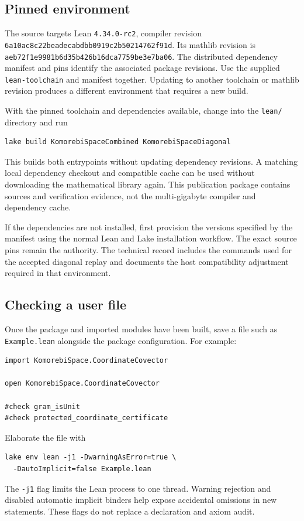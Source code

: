 \documentclass[11pt]{article}
\newcommand{\leanname}[1]{{\small\ttfamily\nolinkurl{#1}}}
\begin{document}
\subsection{Pinned environment}
The source targets Lean \leanname{4.34.0-rc2}, compiler revision
\leanname{6a10ac8c22beadecabdbb0919c2b50214762f91d}. Its mathlib revision is
\leanname{aeb72f1e9981b6d35b426b16dca7759be3e7ba06}.
The distributed dependency manifest and pins identify the associated package revisions. Use the supplied \leanname{lean-toolchain} and manifest together. Updating to another toolchain or mathlib revision produces a different environment that requires a new build.

With the pinned toolchain and dependencies available, change into the \leanname{lean/} directory and run
\begin{verbatim}
lake build KomorebiSpaceCombined KomorebiSpaceDiagonal
\end{verbatim}
This builds both entrypoints without updating dependency revisions. A matching local dependency checkout and compatible cache can be used without downloading the mathematical library again. This publication package contains sources and verification evidence, not the multi-gigabyte compiler and dependency cache.

If the dependencies are not installed, first provision the versions specified by the manifest using the normal Lean and Lake installation workflow. The exact source pins remain the authority. The technical record includes the commands used for the accepted diagonal replay and documents the host compatibility adjustment required in that environment.

\subsection{Checking a user file}
Once the package and imported modules have been built, save a file such as \leanname{Example.lean} alongside the package configuration. For example:
\begin{verbatim}
import KomorebiSpace.CoordinateCovector

open KomorebiSpace.CoordinateCovector

#check gram_isUnit
#check protected_coordinate_certificate
\end{verbatim}
Elaborate the file with
\begin{verbatim}
lake env lean -j1 -DwarningAsError=true \
  -DautoImplicit=false Example.lean
\end{verbatim}
The \leanname{-j1} flag limits the Lean process to one thread. Warning rejection and disabled automatic implicit binders help expose accidental omissions in new statements. These flags do not replace a declaration and axiom audit.
\end{document}
